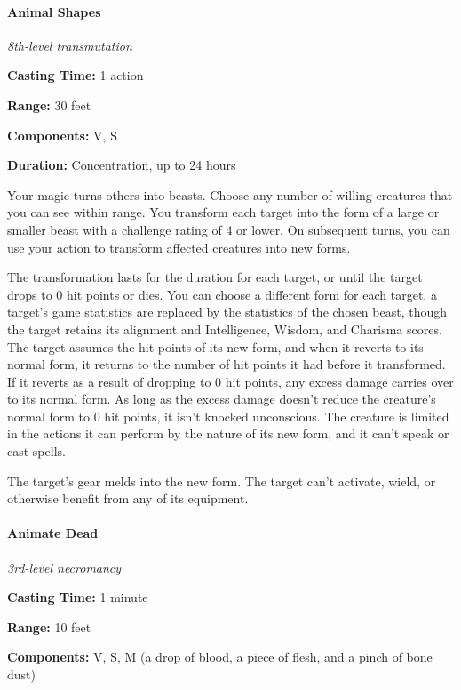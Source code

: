 \documentclass[
]{article}
\begin{document}
\hypertarget{animal-shapes}{%
\paragraph{Animal Shapes}\label{animal-shapes}}

\emph{8th-level transmutation}

\textbf{Casting Time:} 1 action

\textbf{Range:} 30 feet

\textbf{Components:} V, S

\textbf{Duration:} Concentration, up to 24 hours

Your magic turns others into beasts. Choose any number of willing
creatures that you can see within range. You transform each target into
the form of a large or smaller beast with a challenge rating of 4 or
lower. On subsequent turns, you can use your action to transform
affected creatures into new forms.

The transformation lasts for the duration for each target, or until the
target drops to 0 hit points or dies. You can choose a different form
for each target. a target's game statistics are replaced by the
statistics of the chosen beast, though the target retains its alignment
and Intelligence, Wisdom, and Charisma scores. The target assumes the
hit points of its new form, and when it reverts to its normal form, it
returns to the number of hit points it had before it transformed. If it
reverts as a result of dropping to 0 hit points, any excess damage
carries over to its normal form. As long as the excess damage doesn't
reduce the creature's normal form to 0 hit points, it isn't knocked
unconscious. The creature is limited in the actions it can perform by
the nature of its new form, and it can't speak or cast spells.

The target's gear melds into the new form. The target can't activate,
wield, or otherwise benefit from any of its equipment.

\hypertarget{animate-dead}{%
\paragraph{Animate Dead}\label{animate-dead}}

\emph{3rd-level necromancy}

\textbf{Casting Time:} 1 minute

\textbf{Range:} 10 feet

\textbf{Components:} V, S, M (a drop of blood, a piece of flesh, and a
pinch of bone dust)
\end{document}
